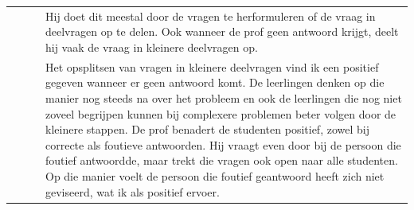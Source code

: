 \documentclass[a4paper,12pt,twoside]{article}%
\begin{document}
\begin{landscape}
		
		\begin{tabularx}{1.56\textwidth}{|Q{0.25\textwidth}|Q{0.1\textwidth}|Q{0.25\textwidth}|Q{0.85\textwidth}|}
			& & & Hij doet dit meestal door de vragen te herformuleren of de vraag in deelvragen op te delen. Ook wanneer de prof geen antwoord krijgt, deelt hij vaak de vraag in kleinere deelvragen op.  \\
			& & & Het opsplitsen van vragen in kleinere deelvragen vind ik een positief gegeven wanneer er geen antwoord komt. De leerlingen denken op die manier nog steeds na over het probleem en ook de leerlingen die nog niet zoveel begrijpen kunnen  bij complexere problemen beter volgen door de kleinere stappen. De prof benadert de studenten positief, zowel bij correcte als foutieve antwoorden. Hij vraagt even door bij de persoon die foutief antwoordde, maar trekt die vragen ook open naar alle studenten. Op die manier voelt de persoon die foutief geantwoord heeft zich niet geviseerd, wat ik als positief ervoer. \\\hline
		\end{tabularx}
		
	\end{landscape}



\end{document}
